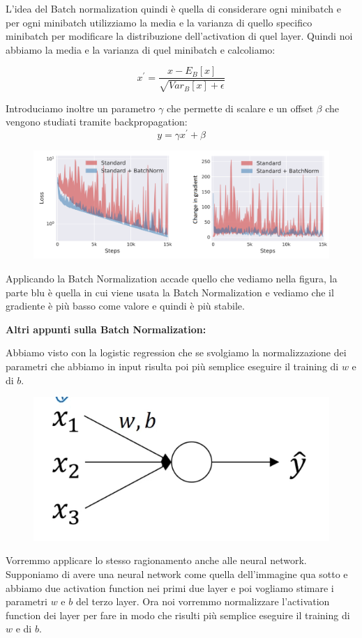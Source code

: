 \documentclass[14pt]{extreport}
\begin{document}
L'idea del Batch normalization quindi è quella di considerare ogni minibatch e per ogni minibatch utilizziamo 
la media e la varianza di quello specifico minibatch per modificare la distribuzione dell'activation di quel layer.
Quindi noi abbiamo la media e la varianza di quel minibatch e calcoliamo:

$$x^{'} = \frac{x-E_B[x]}{\sqrt{Var_B[x]+\epsilon}}$$

Introduciamo inoltre un parametro $\gamma$ che permette di scalare e un offset $\beta$ che vengono studiati tramite backpropagation:
$$y = \gamma x^{'} + \beta$$

\begin{figure}[H]
\centering
\includegraphics[width=0.7\linewidth]{430.jpeg}
\end{figure}

Applicando la Batch Normalization accade quello che vediamo nella figura, la parte blu è quella
in cui viene usata la Batch Normalization e vediamo che il gradiente è più basso come valore e quindi è più stabile.


\textbf{Altri appunti sulla Batch Normalization:}

Abbiamo visto con la logistic regression che se svolgiamo la normalizzazione dei parametri che abbiamo in input 
risulta poi più semplice eseguire il training di $w$ e di $b$.

\begin{figure}[H] 
\centering
\includegraphics[width=0.7\linewidth]{568.jpeg}
\end{figure}

Vorremmo applicare lo stesso ragionamento anche alle neural network. Supponiamo di avere una neural network come quella dell'immagine 
qua sotto e abbiamo due activation function nei primi due layer e poi vogliamo stimare i parametri $w$ e $b$ del terzo layer.
Ora noi vorremmo normalizzare l'activation function dei layer per fare in modo che risulti più semplice eseguire il training 
di $w$ e di $b$.
\end{document}
